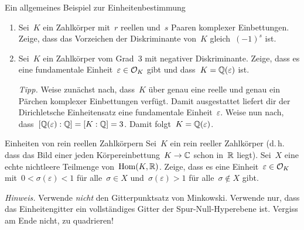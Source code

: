 \documentclass{uebblatt}
\begin{document}
\begin{aufgabe}{Ein allgemeines Beispiel zur Einheitenbestimmung}
\begin{enumerate}
\item Sei~$K$ ein Zahlkörper mit~$r$ reellen und~$s$ Paaren komplexer
Einbettungen. Zeige, dass das Vorzeichen der Diskriminante von~$K$
gleich~$(-1)^s$ ist.
\item Sei~$K$ ein Zahlkörper vom Grad~3 mit negativer Diskriminante. Zeige,
dass es eine fundamentale Einheit~$\varepsilon \in \mathcal{O}_K$ gibt und dass~$K =
\mathbb{Q}(\varepsilon)$ ist.

{\tiny\emph{Tipp.} Weise zunächst nach, dass~$K$ über genau eine reelle und
genau ein Pärchen komplexer Einbettungen verfügt. Damit ausgestattet liefert
dir der Dirichletsche Einheitensatz eine fundamentale Einheit~$\varepsilon$.
Weise nun nach, dass~$[\mathbb{Q}(\varepsilon) : \mathbb{Q}] = [K : \mathbb{Q}] = 3$. Damit folgt~$K
= \mathbb{Q}(\varepsilon)$.\par}
\end{enumerate}
\end{aufgabe}

\begin{aufgabe}{Einheiten von rein reellen Zahlkörpern}
Sei~$K$ ein rein reeller Zahlkörper (d.\,h. dass das Bild einer jeden
Körpereinbettung~$K \to \mathbb{C}$ schon in~$\mathbb{R}$ liegt). Sei~$X$ eine echte
nichtleere Teilmenge von~$\mathrm{Hom}(K, \mathbb{R})$. Zeige, dass es eine
Einheit~$\varepsilon \in \mathcal{O}_K$ mit~$0 < \sigma(\varepsilon) < 1$ für alle~$\sigma \in X$
und~$\sigma(\varepsilon) > 1$ für alle~$\sigma \not\in X$ gibt.

{\tiny\emph{Hinweis.} Verwende \emph{nicht} den Gitterpunktsatz von Minkowski.
Verwende nur, dass das Einheitengitter ein vollständiges Gitter der
Spur-Null-Hyperebene ist. Vergiss am Ende nicht, zu quadrieren!\par}
\end{aufgabe}
\end{document}
